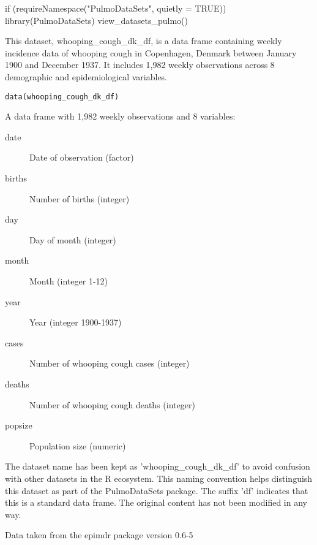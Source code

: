 \documentclass[a4paper]{book}
\begin{document}
%
\begin{Examples}
\begin{ExampleCode}
if (requireNamespace("PulmoDataSets", quietly = TRUE)) {
  library(PulmoDataSets)
  view_datasets_pulmo()
}
\end{ExampleCode}
\end{Examples}
%
\begin{Description}
This dataset, whooping\_cough\_dk\_df, is a data frame containing weekly incidence data
of whooping cough in Copenhagen, Denmark between January 1900 and December 1937.
It includes 1,982 weekly observations across 8 demographic and epidemiological variables.
\end{Description}
%
\begin{Usage}
\begin{verbatim}
data(whooping_cough_dk_df)
\end{verbatim}
\end{Usage}
%
\begin{Format}
A data frame with 1,982 weekly observations and 8 variables:
\begin{description}

\item[date] Date of observation (factor)
\item[births] Number of births (integer)
\item[day] Day of month (integer)
\item[month] Month (integer 1-12)
\item[year] Year (integer 1900-1937)
\item[cases] Number of whooping cough cases (integer)
\item[deaths] Number of whooping cough deaths (integer)
\item[popsize] Population size (numeric)

\end{description}

\end{Format}
%
\begin{Details}
The dataset name has been kept as 'whooping\_cough\_dk\_df' to avoid confusion with other
datasets in the R ecosystem. This naming convention helps distinguish this dataset
as part of the PulmoDataSets package. The suffix 'df' indicates that this is a
standard data frame. The original content has not been modified in any way.
\end{Details}
%
\begin{Source}
Data taken from the epimdr package version 0.6-5
\end{Source}
\end{document}
